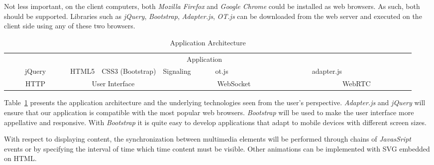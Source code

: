 Not less important, on the client computers, both \emph{Mozilla Firefox} and \emph{Google Chrome} could be installed as web browsers. As such, both should be supported. Libraries such as \emph{jQuery}, \emph{Bootstrap}, \emph{Adapter.js}, \emph{OT.js} can be downloaded from the web server and executed on the client side using any of these two browsers.

\begin{table}[H]
\centering
	\caption{Application Architecture}
	\label{table:apparch}
    \begin{tabular}{ccccccccc@{}m{0pt}@{}}
	\hline 
\multicolumn{9}{|c|}{\cellcolor{Gray}Application}  &\\[12pt]\cline{1-6}\cline{8-8}
\multicolumn{2}{|c|}{~~~~~jQuery~~~~~} & \multicolumn{1}{c|}{HTML5} & \multicolumn{1}{c|}{CSS3 (Bootstrap)} & \multicolumn{1}{c|}{Signaling} & \multicolumn{1}{c|}{~~~~~ot.js~~~~~} & \multicolumn{1}{c|}{\cellcolor{Gray}~~~~~~~~~~~~~~~} & \multicolumn{1}{c|}{adapter.js} &   \multicolumn{1}{c|}{\cellcolor{Gray}~~~~~~~~~~~~~~~} &\\[12pt]\hline
\multicolumn{1}{|c|}{HTTP} & \multicolumn{3}{c|}{User Interface}  & \multicolumn{3}{c|}{WebSocket}    & \multicolumn{2}{c|}{WebRTC}      &\\[12pt]\hline
\end{tabular}
\end{table}


Table~\ref{table:apparch} presents the application architecture and the underlying technologies seen from the user's perspective. \emph{Adapter.js} and \emph{jQuery} will ensure that our application is compatible with the most popular web browsers.
\emph{Bootstrap} will be used to make the user interface more appellative and responsive. With \emph{Bootstrap} it is quite easy to develop applications that adapt to mobile devices with different screen sizes.

With respect to displaying content, the synchronization between multimedia elements will be performed through chains of \emph{JavasSript} events or by specifying the interval of time which time content must be visible. Other animations can be implemented with \ac{SVG} embedded on \ac{HTML}.

